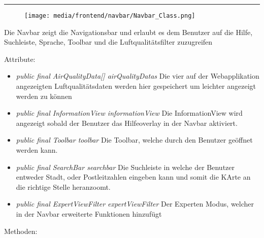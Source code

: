 \rule{\textwidth}{0.4pt} 
\begin{minipage}{0.3\textwidth}
    \begin{figure}[H]
        \texttt{[image: media/frontend/navbar/Navbar\_Class.png]}
    \end{figure}
    \end{minipage} \hfill
    \begin{minipage}{0.6\textwidth}
Die Navbar zeigt die Navigationsbar und erlaubt es dem Benutzer auf die Hilfe, Suchleiste, Sprache, Toolbar und die Luftqualitätsfilter zuzugreifen
\end{minipage}

Attribute:
\begin{itemize} 
    \item \emph{public final AirQualityData[] airQualityDatas} Die vier auf der Webapplikation angezeigten Luftqualitätsdaten werden hier gespeichert um leichter angezeigt werden zu können
    \item \emph{public final InformationView informationView} Die InformationView wird angezeigt sobald der Benutzer das Hilfeoverlay in der Navbar aktiviert.
    \item \emph{public final Toolbar toolbar} Die Toolbar, welche durch den Benutzer geöffnet werden kann.
    \item \emph{public final SearchBar searchbar} Die Suchleiste in welche der Benutzer entweder Stadt, oder Postleitzahlen eingeben kann und somit die KArte an die richtige Stelle heranzoomt.
    \item \emph{public final ExpertViewFilter expertViewFilter} Der Experten Modus, welcher in der Navbar erweiterte Funktionen hinzufügt
    
\end{itemize}
Methoden:
